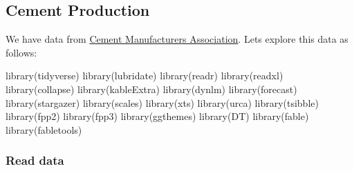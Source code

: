 \documentclass[
  letterpaper,
  DIV=11,
  numbers=noendperiod]{scrartcl}
\newenvironment{Shaded}{\begin{snugshade}}{\end{snugshade}}
\newcommand{\CommentTok}[1]{\textcolor[rgb]{0.37,0.37,0.37}{#1}}
\newcommand{\DocumentationTok}[1]{\textcolor[rgb]{0.37,0.37,0.37}{\textit{#1}}}
\newcommand{\FunctionTok}[1]{\textcolor[rgb]{0.28,0.35,0.67}{#1}}
\newcommand{\NormalTok}[1]{\textcolor[rgb]{0.00,0.23,0.31}{#1}}
\newcommand{\OtherTok}[1]{\textcolor[rgb]{0.00,0.23,0.31}{#1}}
\newcommand{\StringTok}[1]{\textcolor[rgb]{0.13,0.47,0.30}{#1}}
\begin{document}
\hypertarget{cement-production}{%
\subsection{Cement Production}\label{cement-production}}

We have data from \href{https://www.apcma.com}{Cement Manufacturers
Association}. Lets explore this data as follows:

\begin{Shaded}
\begin{Highlighting}[]
\FunctionTok{library}\NormalTok{(tidyverse)}
\FunctionTok{library}\NormalTok{(lubridate)}
\FunctionTok{library}\NormalTok{(readr)}
\FunctionTok{library}\NormalTok{(readxl)}
\FunctionTok{library}\NormalTok{(collapse)}
\FunctionTok{library}\NormalTok{(kableExtra)}
\FunctionTok{library}\NormalTok{(dynlm)}
\FunctionTok{library}\NormalTok{(forecast)}
\FunctionTok{library}\NormalTok{(stargazer)}
\FunctionTok{library}\NormalTok{(scales)}
\FunctionTok{library}\NormalTok{(xts)}
\FunctionTok{library}\NormalTok{(urca)}
\FunctionTok{library}\NormalTok{(tsibble)}
\FunctionTok{library}\NormalTok{(fpp2)}
\FunctionTok{library}\NormalTok{(fpp3)}
\FunctionTok{library}\NormalTok{(ggthemes)}
\FunctionTok{library}\NormalTok{(DT)}
\FunctionTok{library}\NormalTok{(fable)}
\FunctionTok{library}\NormalTok{(fabletools)}
\end{Highlighting}
\end{Shaded}

\hypertarget{read-data}{%
\subsubsection{Read data}\label{read-data}}

\begin{Shaded}
\end{Shaded}
\end{document}
